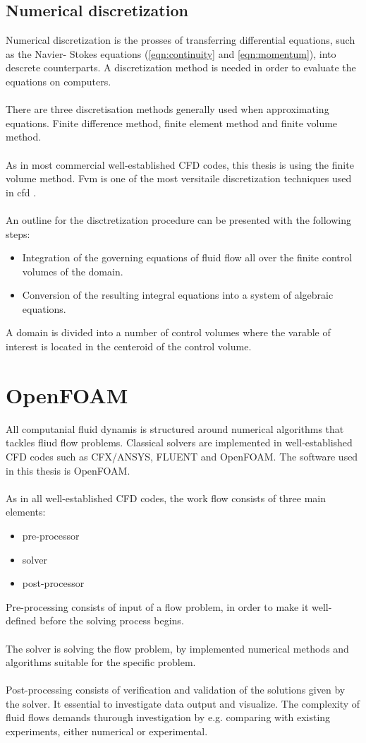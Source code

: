 \documentclass[a4paper, 12pt]{report}
\begin{document}
\section{Numerical discretization}
Numerical discretization is the prosses of transferring differential equations, such as the Navier- Stokes equations (\ref{eqn:continuity} and \ref{eqn:momentum}), into descrete counterparts.
A discretization method is needed in order to evaluate the equations on computers. \\
\\
There are three discretisation methods generally used when approximating equations. Finite difference method, finite element method and finite volume method.\\
\\
As in most commercial well-established CFD codes, this thesis is using the finite volume method. Fvm is one of the most versitaile discretization techniques used in cfd \cite{CFD}.\\
\\
An outline for the disctretization procedure can be presented with the following steps:
\begin{itemize}
\item Integration of the governing equations of fluid flow all over the finite control volumes of the domain.
\item Conversion of the resulting integral equations into a system of algebraic equations.
\end{itemize}
A domain is divided into a number of control volumes where the varable of interest is located in the centeroid of the control volume.

\chapter{OpenFOAM}
All computanial fluid dynamis is structured around numerical algorithms that tackles fliud flow problems. Classical solvers are implemented in well-established CFD codes such as CFX/ANSYS, FLUENT and OpenFOAM. The software used in this thesis is OpenFOAM.\\
\\   
As in all well-established CFD codes, the work flow consists of three main elements:
\begin{itemize}
\item pre-processor
\item solver
\item post-processor
\end{itemize}
Pre-processing consists of input of a flow problem, in order to make it well-defined before the solving process begins.\\
\\
The solver is solving the flow problem, by implemented numerical methods and algorithms suitable for the specific problem. \\
\\
Post-processing consists of verification and validation of the solutions given by the solver. It essential to investigate data output and visualize. The complexity of fluid flows demands thurough investigation by e.g. comparing with existing experiments, either numerical or experimental.\\
\\
\end{document}
